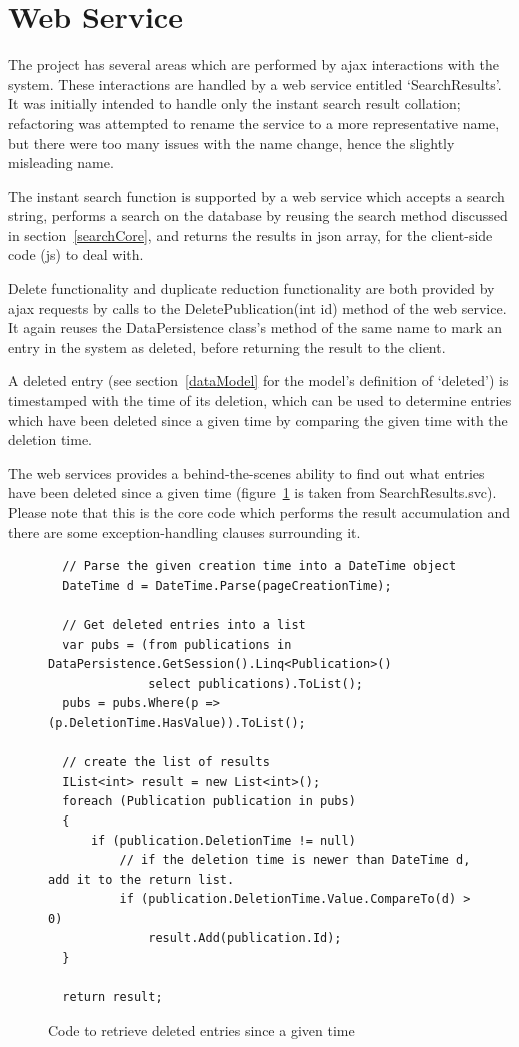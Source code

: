 \section{Web Service}
The project has several areas which are performed by \gls{ajax} interactions with the system.  These interactions are handled by a web service entitled `SearchResults'. It was initially intended to handle only the instant search result collation; refactoring was attempted to rename the service to a more representative name, but there were too many issues with the name change, hence the slightly misleading name.

The instant search function is supported by a web service which accepts a search string, performs a search on the database by reusing the search method discussed in section~\ref{searchCore}, and returns the results in \gls{json} array, for the client-side code (\gls{js}) to deal with.  

Delete functionality and duplicate reduction functionality are both provided by \gls{ajax} requests by calls to the DeletePublication(int id) method of the web service.  It again reuses the DataPersistence class's method of the same name to mark an entry in the system as deleted, before returning the result to the client.

A deleted entry (see section~\ref{dataModel} for the model's definition of `deleted') is timestamped with the time of its deletion, which can be used to determine entries which have been deleted since a given time by comparing the given time with the deletion time. 

The web services provides a behind-the-scenes ability to find out what entries have been deleted since a given time (figure~\ref{fig:getDeletedPublicationsWS} is taken from SearchResults.svc).  Please note that this is the core code which performs the result accumulation and there are some exception-handling clauses surrounding it.

\begin{figure}
	\begin{center}
			\lstset{language=CSharp} 
			\begin{lstlisting}
  // Parse the given creation time into a DateTime object
  DateTime d = DateTime.Parse(pageCreationTime);

  // Get deleted entries into a list
  var pubs = (from publications in DataPersistence.GetSession().Linq<Publication>()
              select publications).ToList();
  pubs = pubs.Where(p => (p.DeletionTime.HasValue)).ToList();

  // create the list of results
  IList<int> result = new List<int>();
  foreach (Publication publication in pubs)
  {
      if (publication.DeletionTime != null)
          // if the deletion time is newer than DateTime d, add it to the return list.
          if (publication.DeletionTime.Value.CompareTo(d) > 0)
              result.Add(publication.Id);
  }

  return result;
			\end{lstlisting}
		\caption{Code to retrieve deleted entries since a given time}
		\label{fig:getDeletedPublicationsWS}
	\end{center}
\end{figure}

